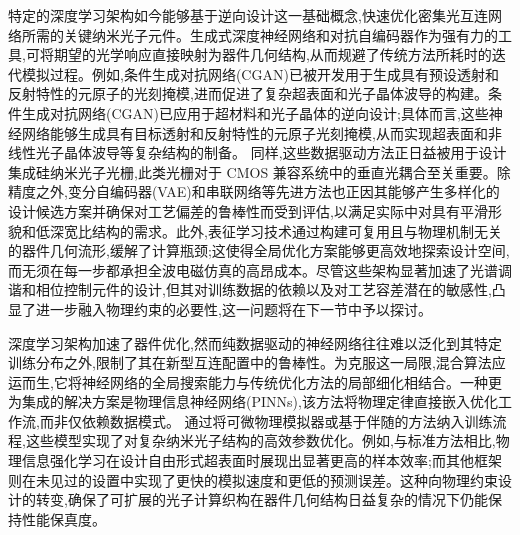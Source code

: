 特定的深度学习架构如今能够基于逆向设计这一基础概念,快速优化密集光互连网络所需的关键纳米光子元件。生成式深度神经网络和对抗自编码器作为强有力的工具,可将期望的光学响应直接映射为器件几何结构,从而规避了传统方法所耗时的迭代模拟过程。例如,条件生成对抗网络(CGAN)已被开发用于生成具有预设透射和反射特性的元原子的光刻掩模,进而促进了复杂超表面和光子晶体波导的构建。条件生成对抗网络(CGAN)已应用于超材料和光子晶体的逆向设计;具体而言,这些神经网络能够生成具有目标透射和反射特性的元原子光刻掩模,从而实现超表面和非线性光子晶体波导等复杂结构的制备。\citep{doi_10_1109_metamaterials62190_2024_10703328_b89eaef7} 同样,这些数据驱动方法正日益被用于设计集成硅纳米光子光栅,此类光栅对于 CMOS 兼容系统中的垂直光耦合至关重要。除精度之外,变分自编码器(VAE)和串联网络等先进方法也正因其能够产生多样化的设计候选方案并确保对工艺偏差的鲁棒性而受到评估,以满足实际中对具有平滑形貌和低深宽比结构的需求。此外,表征学习技术通过构建可复用且与物理机制无关的器件几何流形,缓解了计算瓶颈;这使得全局优化方案能够更高效地探索设计空间,而无须在每一步都承担全波电磁仿真的高昂成本。尽管这些架构显著加速了光谱调谐和相位控制元件的设计,但其对训练数据的依赖以及对工艺容差潜在的敏感性,凸显了进一步融入物理约束的必要性,这一问题将在下一节中予以探讨。\citep{doi_10_1109_metamaterials62190_2024_10703328_b89eaef7} \citep{doi_10_1109_cleo_europe_eqec52157_2021_9542763_c5b6331c} \citep{doi_10_29026_oes_2022_210012_27973a69} \citep{doi_10_1002_adom_202502062_d73a85e1}

深度学习架构加速了器件优化,然而纯数据驱动的神经网络往往难以泛化到其特定训练分布之外,限制了其在新型互连配置中的鲁棒性。为克服这一局限,混合算法应运而生,它将神经网络的全局搜索能力与传统优化方法的局部细化相结合。一种更为集成的解决方案是物理信息神经网络(PINNs),该方法将物理定律直接嵌入优化工作流,而非仅依赖数据模式。\citep{doi_10_1038_s41467_025_64624_3_42144da5} \citep{doi_10_3390_s25196242_b7203a7f} 通过将可微物理模拟器或基于伴随的方法纳入训练流程,这些模型实现了对复杂纳米光子结构的高效参数优化。例如,与标准方法相比,物理信息强化学习在设计自由形式超表面时展现出显著更高的样本效率;而其他框架则在未见过的设置中实现了更快的模拟速度和更低的预测误差。这种向物理约束设计的转变,确保了可扩展的光子计算织构在器件几何结构日益复杂的情况下仍能保持性能保真度。\citep{doi_10_1021_acsphotonics_2c00968_06a2e96b} \citep{s2_037e66f37189104d61c0d000de0cee202b7eec9e_d15b8018} \citep{doi_10_1515_nanoph_2023_0852_cb27a26f} \citep{doi_10_48550_arxiv_2209_10098_b3bedb78}

